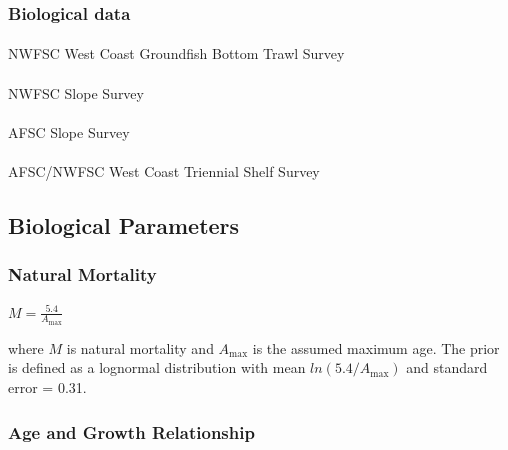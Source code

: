 \documentclass[
]{scrartcl}
\makeatletter
\let\oldparagraph\paragraph
\renewcommand{\paragraph}{
    \@ifstar
      \xxxParagraphStar
      \xxxParagraphNoStar
  }
\newcommand{\xxxParagraphStar}[1]{\oldparagraph*{#1}\mbox{}}
\newcommand{\xxxParagraphNoStar}[1]{\oldparagraph{#1}\mbox{}}
\makeatother
\begin{document}
\subsubsection{Biological data}\label{biological-data-1}

\paragraph{NWFSC West Coast Groundfish Bottom Trawl
Survey}\label{nwfsc-west-coast-groundfish-bottom-trawl-survey-1}

\paragraph{NWFSC Slope Survey}\label{nwfsc-slope-survey-1}

\paragraph{AFSC Slope Survey}\label{afsc-slope-survey-1}

\paragraph{AFSC/NWFSC West Coast Triennial Shelf
Survey}\label{afscnwfsc-west-coast-triennial-shelf-survey-1}

\subsection{Biological Parameters}\label{biological-parameters}

\subsubsection{Natural Mortality}\label{natural-mortality}

\begin{centering}

$M=\frac{5.4}{A_{\text{max}}}$

\end{centering}

\vspace{0.5cm}

where \(M\) is natural mortality and \({A_{\text{max}}}\) is the assumed
maximum age. The prior is defined as a lognormal distribution with mean
\(ln(5.4/A_{\text{max}})\) and standard error = 0.31.

\subsubsection{Age and Growth
Relationship}\label{age-and-growth-relationship}
\end{document}
